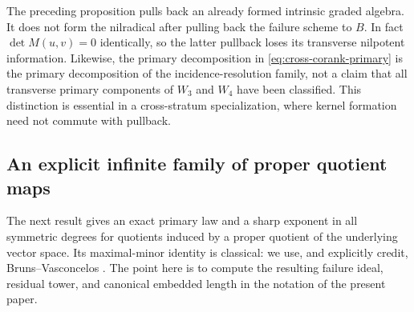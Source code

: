 \begin{remark}
The preceding proposition pulls back an already formed intrinsic graded
algebra.  It does not form the nilradical after pulling back the failure
scheme to \(B\).  In fact \(\det M(u,v)=0\) identically, so the
latter pullback loses its transverse nilpotent information.  Likewise,
the primary decomposition in \eqref{eq:cross-corank-primary} is the
primary decomposition of the incidence-resolution family, not a claim
that all transverse primary components of \(W_3\) and \(W_4\) have
been classified.  This distinction is essential in a cross-stratum
specialization, where kernel formation need not commute with pullback.
\end{remark}

\subsection{An explicit infinite family of proper quotient maps}

The next result gives an exact primary law and a sharp exponent in all
symmetric degrees for quotients induced by a proper quotient of the
underlying vector space.  Its maximal-minor identity is classical:
we use, and explicitly credit, Bruns--Vasconcelos
\cite[Theorem 1(2)]{BrunsVasconcelos}.  The point here is to compute the
resulting failure ideal, residual tower, and canonical embedded length
in the notation of the present paper.

